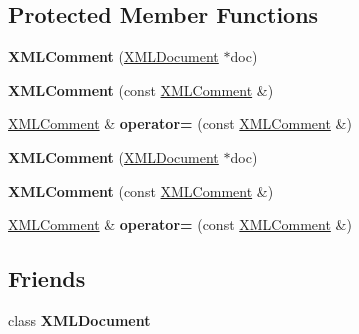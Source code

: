 \subsection*{Protected Member Functions}
\begin{DoxyCompactItemize}
\item 
\mbox{\label{classtinyxml2_1_1XMLComment_ae6463adc3edd93a8e5a9b2b7e99cdf91}} 
{\bfseries X\+M\+L\+Comment} (\hyperlink{classtinyxml2_1_1XMLDocument}{X\+M\+L\+Document} $\ast$doc)
\item 
\mbox{\label{classtinyxml2_1_1XMLComment_aa0a9aae0850ac0e70d3cd20f6cb44447}} 
{\bfseries X\+M\+L\+Comment} (const \hyperlink{classtinyxml2_1_1XMLComment}{X\+M\+L\+Comment} \&)
\item 
\mbox{\label{classtinyxml2_1_1XMLComment_ac8de55f8381d110740772e6bf6f5755a}} 
\hyperlink{classtinyxml2_1_1XMLComment}{X\+M\+L\+Comment} \& {\bfseries operator=} (const \hyperlink{classtinyxml2_1_1XMLComment}{X\+M\+L\+Comment} \&)
\item 
\mbox{\label{classtinyxml2_1_1XMLComment_ae6463adc3edd93a8e5a9b2b7e99cdf91}} 
{\bfseries X\+M\+L\+Comment} (\hyperlink{classtinyxml2_1_1XMLDocument}{X\+M\+L\+Document} $\ast$doc)
\item 
\mbox{\label{classtinyxml2_1_1XMLComment_aa0a9aae0850ac0e70d3cd20f6cb44447}} 
{\bfseries X\+M\+L\+Comment} (const \hyperlink{classtinyxml2_1_1XMLComment}{X\+M\+L\+Comment} \&)
\item 
\mbox{\label{classtinyxml2_1_1XMLComment_ac8de55f8381d110740772e6bf6f5755a}} 
\hyperlink{classtinyxml2_1_1XMLComment}{X\+M\+L\+Comment} \& {\bfseries operator=} (const \hyperlink{classtinyxml2_1_1XMLComment}{X\+M\+L\+Comment} \&)
\end{DoxyCompactItemize}
\subsection*{Friends}
\begin{DoxyCompactItemize}
\item 
\mbox{\label{classtinyxml2_1_1XMLComment_a0a577a5e971b59b321cae12e5b61df55}} 
class {\bfseries X\+M\+L\+Document}
\end{DoxyCompactItemize}
